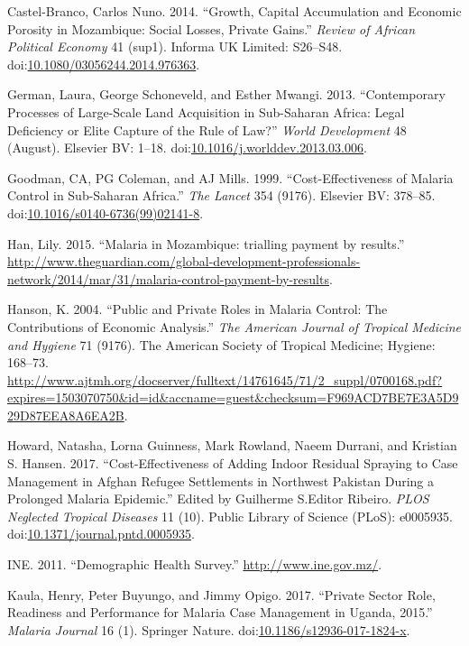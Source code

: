 \documentclass[]{article}
\begin{document}
\hypertarget{ref-CastelBranco2014}{}
Castel-Branco, Carlos Nuno. 2014. ``Growth, Capital Accumulation and
Economic Porosity in Mozambique: Social Losses, Private Gains.''
\emph{Review of African Political Economy} 41 (sup1). Informa UK
Limited: S26--S48.
doi:\href{https://doi.org/10.1080/03056244.2014.976363}{10.1080/03056244.2014.976363}.

\hypertarget{ref-German2013}{}
German, Laura, George Schoneveld, and Esther Mwangi. 2013.
``Contemporary Processes of Large-Scale Land Acquisition in Sub-Saharan
Africa: Legal Deficiency or Elite Capture of the Rule of Law?''
\emph{World Development} 48 (August). Elsevier BV: 1--18.
doi:\href{https://doi.org/10.1016/j.worlddev.2013.03.006}{10.1016/j.worlddev.2013.03.006}.

\hypertarget{ref-Goodman1999}{}
Goodman, CA, PG Coleman, and AJ Mills. 1999. ``Cost-Effectiveness of
Malaria Control in Sub-Saharan Africa.'' \emph{The Lancet} 354 (9176).
Elsevier BV: 378--85.
doi:\href{https://doi.org/10.1016/s0140-6736(99)02141-8}{10.1016/s0140-6736(99)02141-8}.

\hypertarget{ref-Han}{}
Han, Lily. 2015. ``Malaria in Mozambique: trialling payment by
results.''
\url{http://www.theguardian.com/global-development-professionals-network/2014/mar/31/malaria-control-payment-by-results}.

\hypertarget{ref-Hanson2004}{}
Hanson, K. 2004. ``Public and Private Roles in Malaria Control: The
Contributions of Economic Analysis.'' \emph{The American Journal of
Tropical Medicine and Hygiene} 71 (9176). The American Society of
Tropical Medicine; Hygiene: 168--73.
\url{http://www.ajtmh.org/docserver/fulltext/14761645/71/2_suppl/0700168.pdf?expires=1503070750\&id=id\&accname=guest\&checksum=F969ACD7BE7E3A5D929D87EEA8A6EA2B}.

\hypertarget{ref-Howard_2017}{}
Howard, Natasha, Lorna Guinness, Mark Rowland, Naeem Durrani, and
Kristian S. Hansen. 2017. ``Cost-Effectiveness of Adding Indoor Residual
Spraying to Case Management in Afghan Refugee Settlements in Northwest
Pakistan During a Prolonged Malaria Epidemic.'' Edited by Guilherme
S.Editor Ribeiro. \emph{PLOS Neglected Tropical Diseases} 11 (10).
Public Library of Science (PLoS): e0005935.
doi:\href{https://doi.org/10.1371/journal.pntd.0005935}{10.1371/journal.pntd.0005935}.

\hypertarget{ref-estatistica2009}{}
INE. 2011. ``Demographic Health Survey.'' \url{http://www.ine.gov.mz/}.

\hypertarget{ref-Kaula_2017}{}
Kaula, Henry, Peter Buyungo, and Jimmy Opigo. 2017. ``Private Sector
Role, Readiness and Performance for Malaria Case Management in Uganda,
2015.'' \emph{Malaria Journal} 16 (1). Springer Nature.
doi:\href{https://doi.org/10.1186/s12936-017-1824-x}{10.1186/s12936-017-1824-x}.
\end{document}
